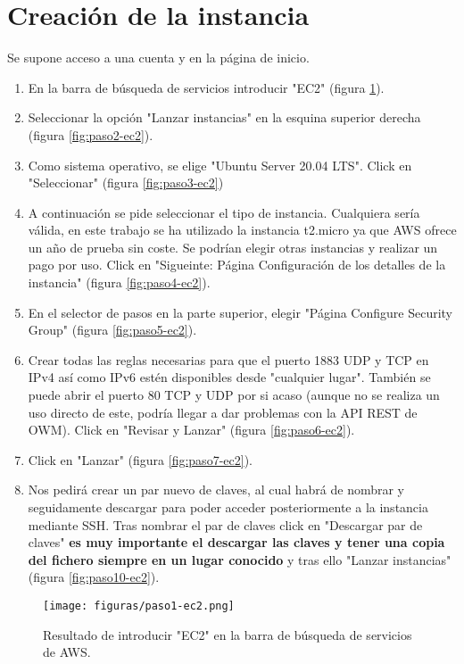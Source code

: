 \documentclass{scrbook}
\begin{document}
\section{Creación de la instancia}
Se supone acceso a una cuenta y en la página de inicio.
\begin{enumerate}
    \item En la barra de búsqueda de servicios introducir "EC2" (figura \ref{fig:paso1-ec2}).
    \item Seleccionar la opción "Lanzar instancias" en la esquina superior derecha (figura \ref{fig:paso2-ec2}).
    \item Como sistema operativo, se elige "Ubuntu Server 20.04 LTS". Click en "Seleccionar" (figura \ref{fig:paso3-ec2})
    \item A continuación se pide seleccionar el tipo de instancia. Cualquiera sería válida, en este trabajo se ha utilizado la instancia t2.micro ya que AWS ofrece un año de prueba sin coste. Se podrían elegir otras instancias y realizar un pago por uso. Click en "Sigueinte: Página Configuración de los detalles de la instancia" (figura \ref{fig:paso4-ec2}).
    \item En el selector de pasos en la parte superior, elegir "Página Configure Security Group" (figura \ref{fig:paso5-ec2}).
    \item Crear todas las reglas necesarias para que el puerto 1883 UDP y TCP en IPv4 así como IPv6 estén disponibles desde "cualquier lugar". También se puede abrir el puerto 80 TCP y UDP por si acaso (aunque no se realiza un uso directo de este, podría llegar a dar problemas con la API REST de OWM). Click en "Revisar y Lanzar" (figura \ref{fig:paso6-ec2}).
    \item Click en "Lanzar" (figura \ref{fig:paso7-ec2}).
    \item Nos pedirá crear un par nuevo de claves, al cual habrá de nombrar y seguidamente descargar para poder acceder posteriormente a la instancia mediante SSH. Tras nombrar el par de claves click en "Descargar par de claves" \textbf{es muy importante el descargar las claves y tener una copia del fichero siempre en un lugar conocido} y tras ello "Lanzar instancias" (figura \ref{fig:paso10-ec2}).
\end{enumerate}

\begin{figure}[htb] 
\begin{center}
\label{fig:paso1-ec2}
\texttt{[image: figuras/paso1-ec2.png]}
\caption{Resultado de introducir "EC2" en la barra de búsqueda de servicios de AWS.} 
\end{center}
\end{figure}
\end{document}
